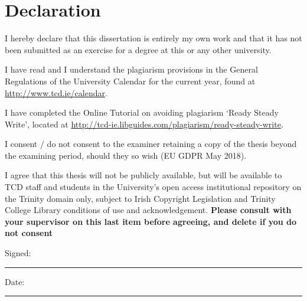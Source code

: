 \section*{\Huge{Declaration}}

\vspace{1cm}
I hereby declare that this dissertation is entirely my own work and that it has not been submitted as an exercise for a degree at this or any other university.

\vspace{1cm}
I have read and I understand the plagiarism provisions in the General Regulations of the University Calendar for the current year, found at \url{http://www.tcd.ie/calendar}.

\vspace{1cm}
I have completed the Online Tutorial on avoiding plagiarism `Ready Steady Write', located at \url{http://tcd-ie.libguides.com/plagiarism/ready-steady-write}.

\vspace{1cm}
I consent / do not consent to the examiner retaining a copy of the thesis beyond the examining period, should they so wish (EU GDPR May 2018).

\vspace{1cm}
I agree that this thesis will not be publicly available, but will be available to TCD staff and students in the University’s open access institutional repository on the Trinity domain only, subject to Irish Copyright Legislation and Trinity College Library conditions of use and acknowledgement.  \textbf{Please consult with your supervisor on this last item before agreeing, and delete if you do not consent}

\vspace{3cm}
Signed:~\rule{5cm}{0.3pt}\hfill Date:~\rule{5cm}{0.3pt}
